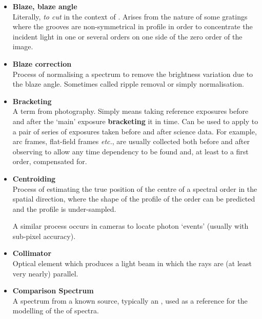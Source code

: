 {{\begin{itemize}
\item {\bf\label{gl_blaze}Blaze, blaze angle}\\
      Literally, {\sl to cut\/} in the context of
      .
      Arises from the nature of some gratings where the grooves are
      non-symmetrical in profile in order to concentrate the incident
      light in one or several orders on one side of the zero order of
      the image.

\item {\bf\label{gl_blaze_correction}Blaze correction}\\
      Process of normalising a spectrum
      to remove the brightness variation due to the blaze angle.
      Sometimes called ripple removal or simply normalisation.

\item {\bf\label{gl_bracketing}Bracketing}\\
      A term from photography.  Simply means taking reference exposures
      before and after the `main' exposure {\bf bracketing} it in time.
      Can be used to apply to a pair of series of exposures taken before
      and after science data.  For example, arc frames, flat-field frames
      {\em etc.}, are usually collected both before and after observing to
      allow any time dependency to be found and, at least to a first order,
      compensated for.

\item {\bf\label{gl_centroiding}Centroiding}\\
      Process of estimating the true position of the centre of a spectral
      order in the spatial direction, where the shape of the profile of
      the order can be predicted and the profile is under-sampled.

      A similar process occurs in  cameras to locate
      photon `events' (usually with sub-pixel accuracy).

\item {\bf\label{gl_collimator}Collimator}\\
      Optical element which produces a light beam in which the rays
      are (at least very nearly) parallel.

\item {\bf\label{gl_comparison}Comparison Spectrum}\\
      A spectrum from a known source, typically an ,
      used as a reference for the modelling of the
       of spectra.


\end{itemize}}}

